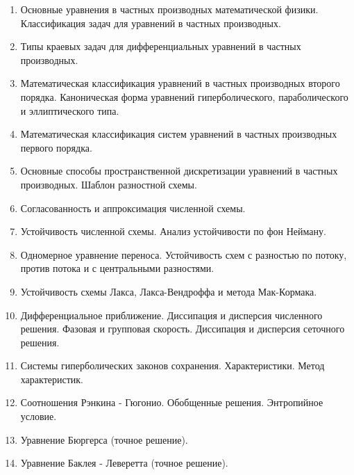 \documentclass[12pt,a4paper]{extarticle}
\author{Губкин Алексей Сергеевич}
\begin{document}

    \begin{enumerate}

        \item Основные уравнения в частных производных математической физики. Классификация задач для уравнений в частных производных.

        \item Типы краевых задач для дифференциальных уравнений в частных производных.

        \item Математическая классификация уравнений в частных производных второго порядка. Каноническая форма уравнений гиперболического, параболического и эллиптического типа.

		\item Математическая классификация систем уравнений в частных производных первого порядка.

		\item Основные способы пространственной дискретизации уравнений в частных производных. Шаблон разностной схемы.

		\item Согласованность и аппроксимация численной схемы.

		\item Устойчивость численной схемы. Анализ устойчивости по фон Нейману.

		\item Одномерное уравнение переноса. Устойчивость схем с разностью по потоку, против потока и с центральными разностями.

		\item Устойчивость схемы Лакса, Лакса-Вендроффа и метода Мак-Кормака.

		\item Дифференциальное приближение. Диссипация и дисперсия численного решения. Фазовая и групповая скорость. Диссипация и дисперсия сеточного решения.

		\item Системы гиперболических законов сохранения. Характеристики. Метод характеристик.

		\item Соотношения Рэнкина - Гюгонио. Обобщенные решения. Энтропийное условие.

		\item Уравнение Бюргерса (точное решение).

		\item Уравнение Баклея - Леверетта (точное решение).


\end{enumerate}
\end{document}
